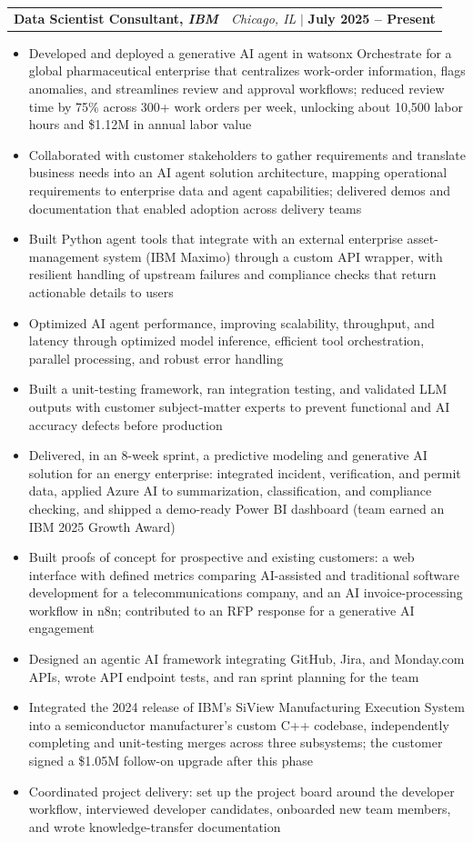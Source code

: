 \documentclass[letterpaper,10pt]{article}
\makeatletter
\newcommand{\resumeItem}[1]{
  \item\small{
    {#1 \vspace{-2pt}}
  }
}
\newcommand{\resumeSubheading}[4]{
  \needspace{4\baselineskip} %
  \item
  \begin{tabular*}{\textwidth}{l@{\extracolsep{\fill}}r}
    \textbf{#1, \small \emph{#3}} & \small{\emph{#4}} $|$ \small{\textbf{#2}} \\
  \end{tabular*}\vspace{-7pt}
}
\newcommand{\resumeItemListStart}{\begin{itemize}}
\newcommand{\resumeItemListEnd}{\end{itemize}\vspace{-5pt}}
\makeatother
\begin{document}
\resumeSubheading
  {Data Scientist Consultant}{July 2025 -- Present}
  {IBM}{Chicago, IL}
  \resumeItemListStart
    \resumeItem{Developed and deployed a generative AI agent in watsonx Orchestrate for a global pharmaceutical enterprise that centralizes work-order information, flags anomalies, and streamlines review and approval workflows; reduced review time by 75\% across 300+ work orders per week, unlocking about 10,500 labor hours and \$1.12M in annual labor value}
    \resumeItem{Collaborated with customer stakeholders to gather requirements and translate business needs into an AI agent solution architecture, mapping operational requirements to enterprise data and agent capabilities; delivered demos and documentation that enabled adoption across delivery teams}
    \resumeItem{Built Python agent tools that integrate with an external enterprise asset-management system (IBM Maximo) through a custom API wrapper, with resilient handling of upstream failures and compliance checks that return actionable details to users}
    \resumeItem{Optimized AI agent performance, improving scalability, throughput, and latency through optimized model inference, efficient tool orchestration, parallel processing, and robust error handling}
    \resumeItem{Built a unit-testing framework, ran integration testing, and validated LLM outputs with customer subject-matter experts to prevent functional and AI accuracy defects before production}
    \resumeItem{Delivered, in an 8-week sprint, a predictive modeling and generative AI solution for an energy enterprise: integrated incident, verification, and permit data, applied Azure AI to summarization, classification, and compliance checking, and shipped a demo-ready Power BI dashboard (team earned an IBM 2025 Growth Award)}
    \resumeItem{Built proofs of concept for prospective and existing customers: a web interface with defined metrics comparing AI-assisted and traditional software development for a telecommunications company, and an AI invoice-processing workflow in n8n; contributed to an RFP response for a generative AI engagement}
    \resumeItem{Designed an agentic AI framework integrating GitHub, Jira, and Monday.com APIs, wrote API endpoint tests, and ran sprint planning for the team}
    \resumeItem{Integrated the 2024 release of IBM's SiView Manufacturing Execution System into a semiconductor manufacturer's custom C++ codebase, independently completing and unit-testing merges across three subsystems; the customer signed a \$1.05M follow-on upgrade after this phase}
    \resumeItem{Coordinated project delivery: set up the project board around the developer workflow, interviewed developer candidates, onboarded new team members, and wrote knowledge-transfer documentation}
  \resumeItemListEnd
\end{document}
